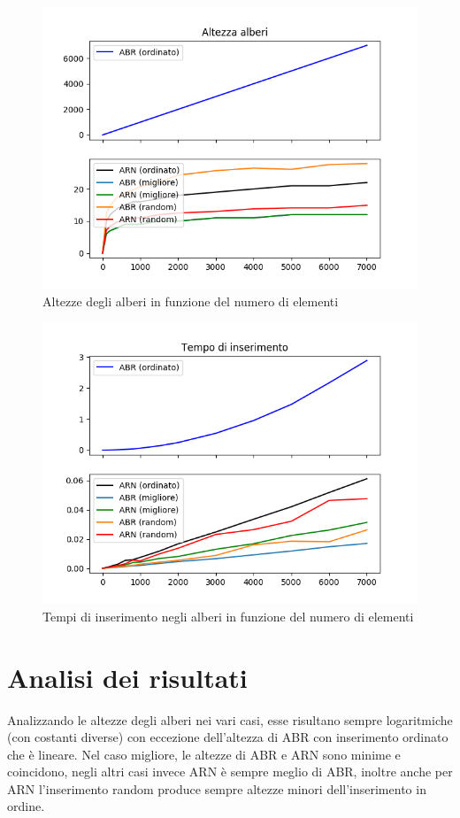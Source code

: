 \documentclass[]{article}
\begin{document}
\begin{figure}[H]
	\includegraphics{altezze.png}
	\caption{Altezze degli alberi in funzione del numero di elementi}
	\label{graficoAltezze}
\end{figure}

\begin{figure}[H]
	\includegraphics{tempi.png}
	\caption{Tempi di inserimento negli alberi in funzione del numero di elementi}
	\label{graficoTempi}
\end{figure}


\section{Analisi dei risultati}
Analizzando le altezze degli alberi nei vari casi, esse risultano sempre logaritmiche (con costanti diverse) con eccezione dell'altezza di ABR con inserimento ordinato che è lineare.
Nel caso migliore, le altezze di ABR e ARN sono minime e coincidono, negli altri casi invece ARN è sempre meglio di ABR, inoltre anche per ARN l'inserimento random produce sempre altezze minori dell'inserimento in ordine.
\end{document}

